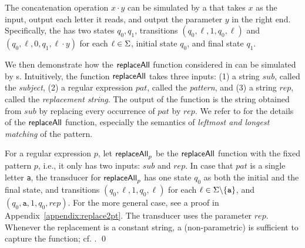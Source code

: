 \begin{example} \label{example:2pt}
 The concatenation operation $x \cdot y$ can be simulated by a \PT{} that takes $x$ as the input, output each letter it reads, and output the parameter $y$ in the right end. Specifically, the \PT{} has two states $q_0, q_1$, transitions $(q_0, \ell, 1, q_0, \ell)$ and $(q_0, \ell, 0, q_1, \ell \cdot y)$ for each $\ell \in \Sigma$,  initial state $q_0$, and final state $q_1$. 
 
  We then demonstrate how the  $\mathsf{replaceAll}$ function considered in \cite{CCHLW18} can be simulated by \PT{}s. 
  Intuitively,  
    the function $\mathsf{replaceAll}$ takes three inputs:
    (1) a string $sub$, called the \emph{subject}, (2) a regular expression
    $pat$, called the \emph{pattern}, and (3) a string $rep$, called
    the \emph{replacement string}. The output of the function is
    the string obtained from $sub$ by replacing every occurrence of $pat$ 
    by $rep$. We refer to \cite{CCHLW18} for the details of the  $\mathsf{replaceAll}$ function, especially the semantics of \emph{leftmost and longest matching} of the pattern. 
    
%
    For a regular expression $p$, let $\mathsf{replaceAll}_{p}$ be the $\mathsf{replaceAll}$ function with the fixed pattern $p$,
    i.e., it only has two inputs: $sub$ and $rep$. In case that $pat$ is  a single letter \texttt{a}, the transducer for $\mathsf{replaceAll}_{p}$ has one state $q_0$ as both the initial and the final state,
    and transitions 
    $(q_0,\ell, 1, q_0, \ell)$ for each $\ell \in \Sigma \backslash
    \{\texttt{a}\}$, 
    and $(q_0, \texttt{a}, 1, q_0, rep)$. For the more general case, see a proof in Appendix~\ref{appendix:replace2pt}.
%    
%    
%
    The transducer uses the parameter $rep$. Whenever the replacement
    is a constant string, a (non-parametric) \FT{} is sufficient to
    capture the function; cf. \cite{LB16}. \qed
\end{example}

